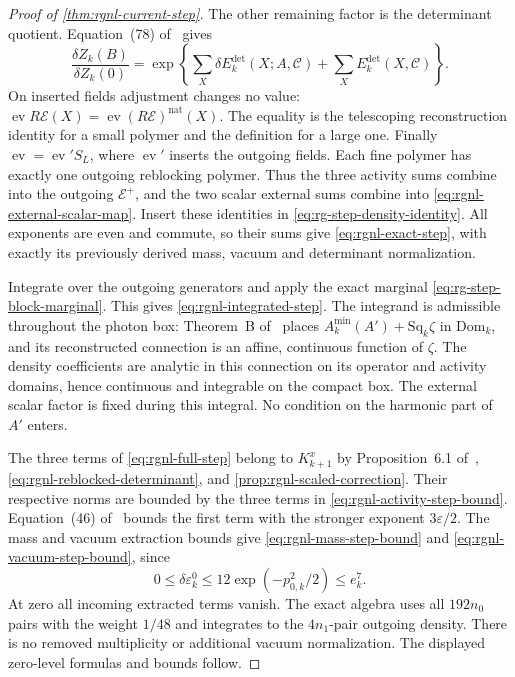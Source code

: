 \documentclass[11pt,letterpaper,reqno]{amsart}
\newcommand{\extref}[2]{#1 of~\cite{#2}}
\newcommand{\exteq}[2]{(#1) of~\cite{#2}}
\begin{document}
\begin{proof}[Proof of \cref{thm:rgnl-current-step}]
The other remaining factor is the determinant quotient.
Equation~\exteq{78}{FermionBlockManuscript} gives
\[
 \frac{\delta Z_k(B)}{\delta Z_k(0)}
      =\exp\left\{\sum_X\delta E_k^{\mathrm{det}}(X;A,\mathscr C)
                               +\sum_XE_k^{\mathrm{det}}(X,\mathscr C)\right\}.
\]
On inserted fields adjustment changes no value:
$\operatorname{ev}R\mathscr E(X)
=\operatorname{ev}(R\mathscr E)^{\mathrm{nat}}(X)$.
The equality is the telescoping reconstruction identity
for a small polymer and the definition for a large one.
Finally $\operatorname{ev}=\operatorname{ev}'S_L$,
where $\operatorname{ev}'$ inserts the outgoing fields.
Each fine polymer has exactly one outgoing reblocking
polymer. Thus the three activity sums combine into the
outgoing $\mathscr E^+$, and the two scalar external sums
combine into \eqref{eq:rgnl-external-scalar-map}.
Insert these identities in
\eqref{eq:rg-step-density-identity}. All exponents are
even and commute, so their sums give
\eqref{eq:rgnl-exact-step}, with exactly its previously
derived mass, vacuum and determinant normalization.

Integrate over the outgoing generators and apply the exact
marginal \eqref{eq:rg-step-block-marginal}. This gives
\eqref{eq:rgnl-integrated-step}.
The integrand is admissible throughout the photon box:
Theorem~\extref{B}{MaxwellBlockManuscript} places
$A_k^{\min}(A')+\mathrm{Sq}_k\zeta$ in
$\mathrm{Dom}_k$, and its reconstructed connection is
an affine, continuous function of $\zeta$.
The density coefficients are analytic in this connection
on its operator and activity domains, hence continuous
and integrable on the compact box.
The external scalar factor is fixed during this integral.
No condition on the harmonic part of $A'$ enters.

The three terms of \eqref{eq:rgnl-full-step} belong to
$K_{k+1}^x$ by Proposition~\extref{6.1}{NormalizedContraction},
\eqref{eq:rgnl-reblocked-determinant}, and
\cref{prop:rgnl-scaled-correction}.
Their respective norms are bounded by the three terms
in \eqref{eq:rgnl-activity-step-bound}.
Equation~\exteq{46}{NormalizedContraction} bounds the
first term with the stronger exponent $3\varepsilon/2$.
The mass and vacuum extraction bounds give
\eqref{eq:rgnl-mass-step-bound} and
\eqref{eq:rgnl-vacuum-step-bound}, since
\[
 0\le\delta\varepsilon_k^0
        \le12\exp(-p_{0,k}^2/2)\le e_k^7.
\]
At zero all incoming extracted terms vanish.
The exact algebra uses all $192n_0$ pairs with the
weight $1/48$ and integrates to the $4n_1$-pair
outgoing density. There is no removed multiplicity
or additional vacuum normalization. The displayed
zero-level formulas and bounds follow.
\end{proof}
\end{document}

